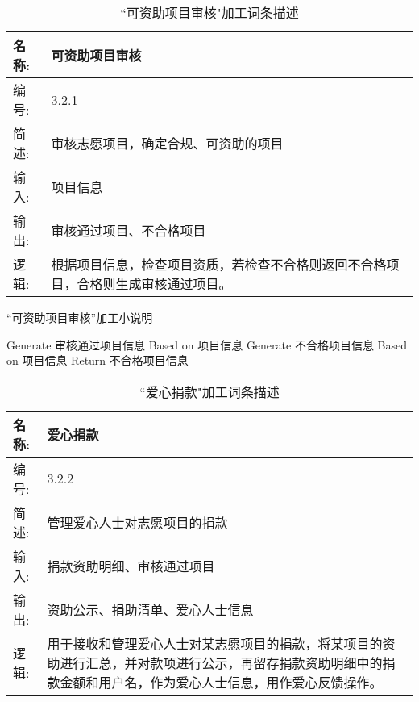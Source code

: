 \begin{table}[H]  
    \caption{``可资助项目审核"加工词条描述}  
    \begin{center}  
        \begin{tabular}{l p{11cm}} 
            \hline
            \quad 名称:  &   可资助项目审核 \\
            \hline
            \quad 编号:  & 3.2.1 \\
            \hline
            \quad 简述:  & 审核志愿项目，确定合规、可资助的项目 \\
            \hline
            \quad 输入:  & 项目信息\\
            \hline
            \quad 输出:  & 审核通过项目、不合格项目 \\
            \hline
            \quad 逻辑:  & 根据项目信息，检查项目资质，若检查不合格则返回不合格项目，合格则生成审核通过项目。 \\
            \hline
        \end{tabular}
        \label{tab1}
    \end{center}
    \end{table}

\begin{algorithm}[H]
    \renewcommand{\thealgorithm}{}
    \caption{“可资助项目审核”加工小说明} 
    \label{alg3} 
    \begin{algorithmic}[1]
        \STATE Generate 审核通过项目信息 Based on 项目信息
        \ELSE
        \STATE Generate 不合格项目信息 Based on 项目信息
        \STATE Return 不合格项目信息
        \ENDIF 
    \end{algorithmic} 
\end{algorithm}
    
    \begin{table}[H]  
    \caption{``爱心捐款"加工词条描述}  
    \begin{center}  
        \begin{tabular}{l p{11cm}} 
            \hline
            \quad 名称:  &   爱心捐款 \\
            \hline
            \quad 编号:  & 3.2.2 \\
            \hline
            \quad 简述:  & 管理爱心人士对志愿项目的捐款 \\
            \hline
            \quad 输入:  & 捐款资助明细、审核通过项目\\
            \hline
            \quad 输出:  & 资助公示、捐助清单、爱心人士信息 \\
            \hline
            \quad 逻辑:  & 用于接收和管理爱心人士对某志愿项目的捐款，将某项目的资助进行汇总，并对款项进行公示，再留存捐款资助明细中的捐款金额和用户名，作为爱心人士信息，用作爱心反馈操作。 \\
            \hline
        \end{tabular}
        \label{tab1}
    \end{center}
    \end{table}

